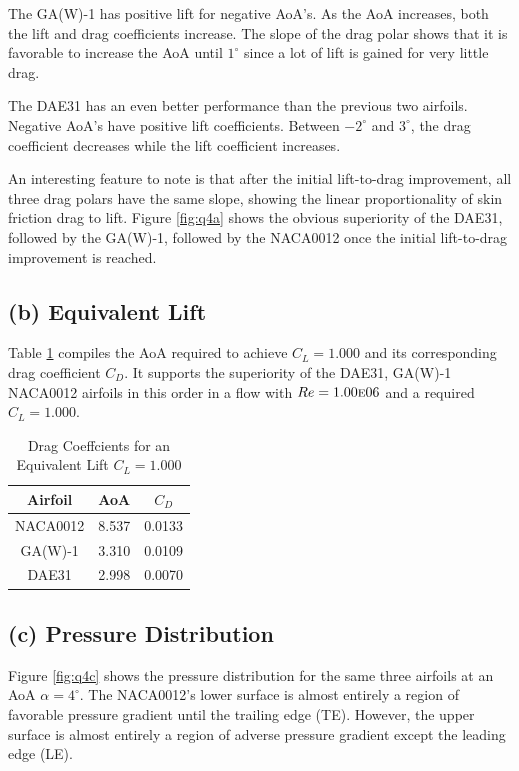 \documentclass[letterpaper,12pt,]{article}
\begin{document}
The GA(W)-1 has positive lift for negative AoA's.
As the AoA increases, both the lift and drag coefficients increase.
The slope of the drag polar shows that it is favorable to increase the AoA until $1^\circ$ since a lot of lift is gained for very little drag.

The DAE31 has an even better performance than the previous two airfoils.
Negative AoA's have positive lift coefficients.
Between $-2^\circ$ and $3^\circ$, the drag coefficient decreases while the lift coefficient increases.

An interesting feature to note is that after the initial lift-to-drag improvement, all three drag polars have the same slope, showing the linear proportionality of skin friction drag to lift. Figure \ref{fig:q4a} shows the obvious superiority of the DAE31, followed by the GA(W)-1, followed by the NACA0012 once the initial lift-to-drag improvement is reached.

\subsection*{(b) Equivalent Lift}
Table \ref{tab2} compiles the AoA required to achieve $C_L = 1.000$ and its corresponding drag coefficient $C_D$.
It supports the superiority of the DAE31, GA(W)-1  NACA0012 airfoils in this order in a flow with $Re = 1.00\textsc{e}06$ and a required $C_L = 1.000$.

\begin{table}[!h]
\centering
\begin{tabular}{ccc} \toprule
    {Airfoil} & {AoA} & {$C_D$} \\ \midrule
    {NACA0012} & 8.537  & 0.0133\\
    {GA(W)-1} & 3.310  & 0.0109\\
    {DAE31} & 2.998  & 0.0070\\
\bottomrule
\end{tabular}
\caption{Drag Coeffcients for an Equivalent Lift $C_L = 1.000$}
\label{tab2}
\end{table}

\subsection*{(c) Pressure Distribution}

Figure \ref{fig:q4c} shows the pressure distribution for the same three airfoils at an AoA $\alpha = 4^\circ$.
The NACA0012's lower surface is almost entirely a region of favorable pressure gradient until the trailing edge (TE). However, the upper surface is almost entirely a region of adverse pressure gradient except the leading edge (LE).
\end{document}
